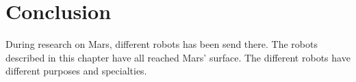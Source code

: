 

\section{Conclusion}
During research on Mars, different robots has been send there. The robots described in this chapter have all reached Mars' surface. The different robots have different purposes and specialties.

